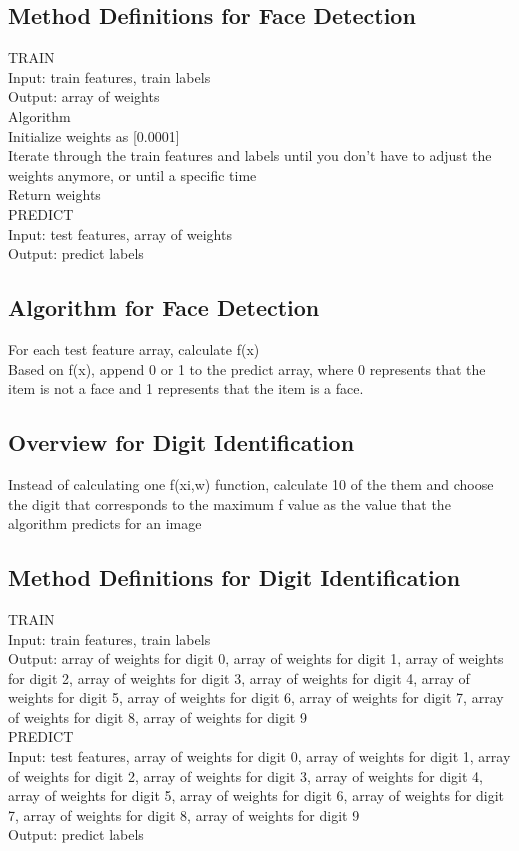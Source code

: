 \documentclass{article}
\begin{document}
\subsection{Method Definitions for Face Detection}
TRAIN\\
Input: train features, train labels\\
Output: array of weights\\
Algorithm\\
Initialize weights as [0.0001]\\
Iterate through the train features and labels until you don’t have to adjust the weights anymore, or until a specific time\\
Return weights\\
PREDICT\\
Input: test features, array of weights\\
Output: predict labels\\

\subsection{Algorithm for Face Detection}
For each test feature array, calculate f(x)\\
Based on f(x), append 0 or 1 to the predict array, where 0 represents that the item is not a face and 1 represents that the item is a face.

\subsection{Overview for Digit Identification}

Instead of calculating one f(xi,w) function, calculate 10 of the them and choose the digit that corresponds to the maximum f value as the value that the algorithm predicts for an image\\

\subsection{Method Definitions for Digit Identification}
TRAIN\\
Input: train features, train labels\\
Output: array of weights for digit 0, array of weights for digit 1, array of weights for digit 2, array of weights for digit 3, array of weights for digit 4, array of weights for digit 5, array of weights for digit 6, array of weights for digit 7, array of weights for digit 8, array of weights for digit 9\\
PREDICT\\
Input: test features, array of weights for digit 0, array of weights for digit 1, array of weights for digit 2, array of weights for digit 3, array of weights for digit 4, array of weights for digit 5, array of weights for digit 6, array of weights for digit 7, array of weights for digit 8, array of weights for digit 9\\
Output: predict labels
\end{document}
